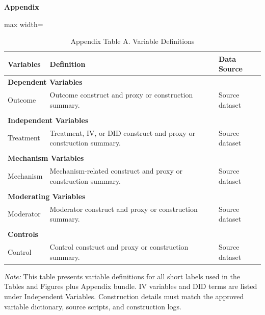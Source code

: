 \documentclass[UTF8]{ctexart}
\begin{document}
\clearpage
\appendix
\begin{center}
{\Large \textbf{Appendix}}
\end{center}
\vspace{1em}

\begin{table}[!htbp]
\centering
\caption{Appendix Table A. Variable Definitions}
\begin{threeparttable}
\small
\begin{adjustbox}{max width=\textwidth}
\begin{tabular}{p{}p{}p{}}
\toprule
Variables & Definition & Data Source \\
\midrule
\multicolumn{3}{l}{\textbf{Dependent Variables}} \\
Outcome & Outcome construct and proxy or construction summary. & Source dataset \\
\\
\multicolumn{3}{l}{\textbf{Independent Variables}} \\
Treatment & Treatment, IV, or DID construct and proxy or construction summary. & Source dataset \\
\\
\multicolumn{3}{l}{\textbf{Mechanism Variables}} \\
Mechanism & Mechanism-related construct and proxy or construction summary. & Source dataset \\
\\
\multicolumn{3}{l}{\textbf{Moderating Variables}} \\
Moderator & Moderator construct and proxy or construction summary. & Source dataset \\
\\
\multicolumn{3}{l}{\textbf{Controls}} \\
Control & Control construct and proxy or construction summary. & Source dataset \\
\bottomrule
\end{tabular}
\end{adjustbox}
\begin{tablenotes}
\footnotesize
\item \textit{Note:} This table presents variable definitions for all short labels used in the Tables and Figures plus Appendix bundle. IV variables and DID terms are listed under Independent Variables. Construction details must match the approved variable dictionary, source scripts, and construction logs.
\end{tablenotes}
\end{threeparttable}
\end{table}
\end{document}
